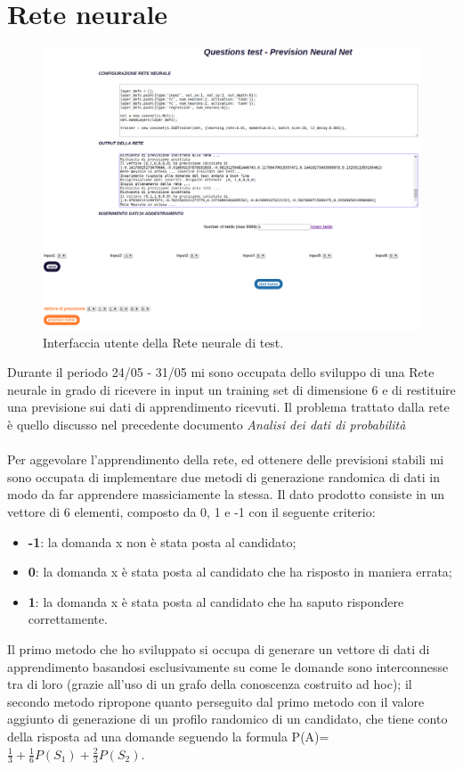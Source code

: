 \section{Rete neurale}
\label{Rete neurale}


\begin{figure}[H]
\centering
	\includegraphics[width=1\linewidth]{./image/GUI-rete-neurale.png}
	\caption{Interfaccia utente della Rete neurale di test.}
\end{figure}
\noindent
Durante il periodo 24/05 - 31/05 mi sono occupata dello sviluppo di una Rete neurale in grado di ricevere in input un training set di dimensione 6 e di restituire una previsione sui dati di apprendimento ricevuti.
\noindent
Il problema trattato dalla rete \`e quello discusso nel precedente documento \textit{Analisi dei dati di probabilit\`a}
\\\\
Per aggevolare l'apprendimento della rete, ed ottenere delle previsioni stabili mi sono occupata di implementare due metodi di generazione randomica di dati in modo da far apprendere massiciamente la stessa.
Il dato prodotto consiste in un vettore di 6 elementi, composto da 0, 1 e -1 con il seguente criterio:
\begin{itemize}
\item \textbf{-1}: la domanda x non \`e stata posta al candidato;
\item \textbf{0}: la domanda x \`e stata posta al candidato che ha risposto in maniera errata;
\item \textbf{1}: la domanda x \`e stata posta al candidato che ha saputo rispondere correttamente.
\end{itemize}
\noindent
Il primo metodo che ho sviluppato si occupa di generare un vettore di dati di apprendimento basandosi esclusivamente su come le domande sono interconnesse tra di loro (grazie all'uso di un grafo della conoscenza costruito ad hoc); il secondo metodo ripropone quanto perseguito dal primo metodo con il valore aggiunto di generazione di un profilo randomico di un candidato, che tiene conto della risposta ad una domande seguendo la formula P(A)= $\frac{1}{3}+\frac{1}{6}P(S_1)+\frac{2}{3}P(S_2)$.

